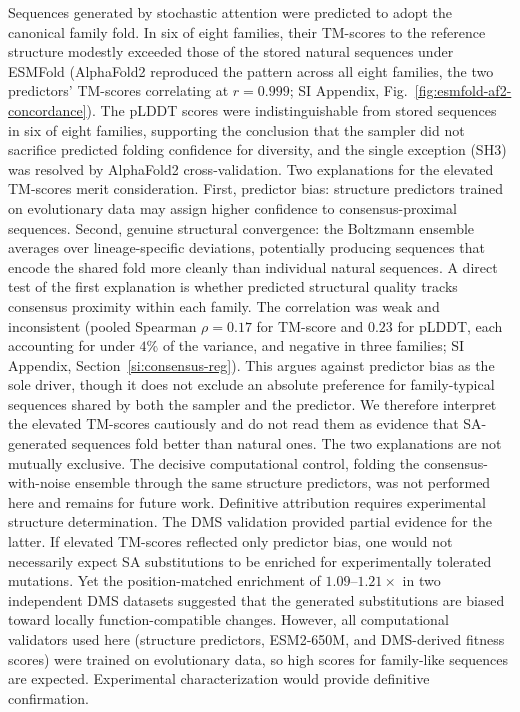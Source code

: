 Sequences generated by stochastic attention were predicted to adopt the canonical family fold. In six of eight families, their TM-scores to the reference structure modestly exceeded those of the stored natural sequences under ESMFold (AlphaFold2 reproduced the pattern across all eight families, the two predictors' TM-scores correlating at $r{=}0.999$; SI Appendix, Fig.~\ref{fig:esmfold-af2-concordance}). The pLDDT scores were indistinguishable from stored sequences in six of eight families, supporting the conclusion that the sampler did not sacrifice predicted folding confidence for diversity, and the single exception (SH3) was resolved by AlphaFold2 cross-validation. Two explanations for the elevated TM-scores merit consideration. First, predictor bias: structure predictors trained on evolutionary data may assign higher confidence to consensus-proximal sequences. Second, genuine structural convergence: the Boltzmann ensemble averages over lineage-specific deviations, potentially producing sequences that encode the shared fold more cleanly than individual natural sequences. A direct test of the first explanation is whether predicted structural quality tracks consensus proximity within each family. The correlation was weak and inconsistent (pooled Spearman $\rho{=}0.17$ for TM-score and $0.23$ for pLDDT, each accounting for under $4\%$ of the variance, and negative in three families; SI Appendix, Section~\ref{si:consensus-reg}). This argues against predictor bias as the sole driver, though it does not exclude an absolute preference for family-typical sequences shared by both the sampler and the predictor. We therefore interpret the elevated TM-scores cautiously and do not read them as evidence that SA-generated sequences fold better than natural ones. The two explanations are not mutually exclusive. The decisive computational control, folding the consensus-with-noise ensemble through the same structure predictors, was not performed here and remains for future work. Definitive attribution requires experimental structure determination. The DMS validation provided partial evidence for the latter. If elevated TM-scores reflected only predictor bias, one would not necessarily expect SA substitutions to be enriched for experimentally tolerated mutations. Yet the position-matched enrichment of $1.09$--$1.21\times$ in two independent DMS datasets suggested that the generated substitutions are biased toward locally function-compatible changes. However, all computational validators used here (structure predictors, ESM2-650M, and DMS-derived fitness scores) were trained on evolutionary data, so high scores for family-like sequences are expected. Experimental characterization would provide definitive confirmation.

